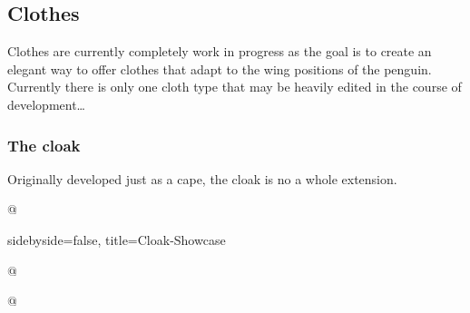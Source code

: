 \documentclass[parskip=half,english,numbers=noenddot,footnotes=nomultiple,oneside]{scrartcl}
\begin{document}
\subsection{Clothes}

Clothes are currently completely work in progress as the goal is to create an elegant way to offer clothes that adapt to the wing positions of the penguin.
Currently there is only one cloth type that may be heavily edited in the course of development\ldots

\subsubsection{The cloak}

Originally developed just as a cape, the cloak is no a whole extension.

\begin{tcblisting}{@}
\begin{tikzpicture}
	\pingu[cloak=green]
\end{tikzpicture}
\end{tcblisting}
\endshowkeyexplain

\begin{tcblisting}{sidebyside=false, title=Cloak-Showcase}
\end{tcblisting}

{\def\pingu@color@cloak{<cloak-color>}
\begin{tcblisting}{@}
\begin{tikzpicture}
	\pingu[cloak, cloak cap=green]
\end{tikzpicture}
\end{tcblisting}
\endsubkeyexplain}

{\def\pingu@color@cloak{<cloak-color>}
\begin{tcblisting}{@}
\begin{tikzpicture}
	\pingu[cloak, cloak wings color=green]
\end{tikzpicture}
\end{tcblisting}
\endsubkeyexplain}
\end{document}
